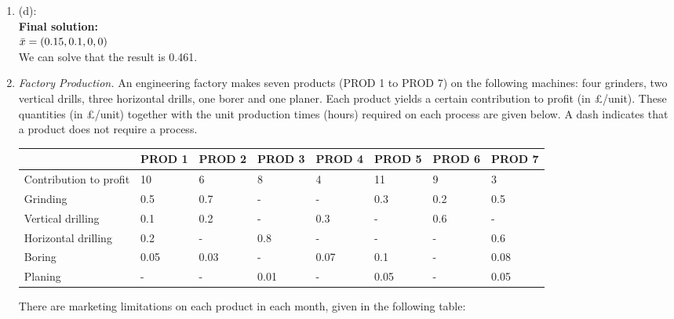 \documentclass[12pt,a4paper]{article}
\makeatletter
\newtheorem*{solution}{Solution}
\theoremstyle{definition}
\renewenvironment{solution}[1][Solution] {\par\pushQED{\qed}\normalfont\topsep6\p@\@plus6\p@\relax\trivlist\item[\hskip\labelsep\bfseries#1\@addpunct{.}]\ignorespaces}{\popQED\endtrivlist\@endpefalse} \makeatother
\makeatother
\begin{document}
\begin{enumerate}
\begin{solution}
    
    
    (d):\\
    \textbf{Final solution: }\\
    
    $\Bar{x} = \left(0.15, 0.1, 0, 0\right)$\\
    We can solve that the result is 0.461.
    
    
    
    \end{solution}
    
    
    
    
    \item
    \textit{Factory Production.} An engineering factory makes seven products (PROD 1 to PROD 7) on the following machines: four grinders, two vertical drills, three horizontal drills, one borer and one planer. Each product yields a certain contribution to profit (in \pounds/unit). These quantities (in \pounds/unit) together with the unit production times (hours) required on each process are given below. A dash indicates that a product does not require a process.

    \begin{table}[htbp]
      \scriptsize
      \centering
      \renewcommand\arraystretch{1.1}
      \begin{tabular}{m{} m{}<{\centering} m{}<{\centering} m{}<{\centering} m{}<{\centering} m{}<{\centering} m{}<{\centering} m{}<{\centering}}
      \hline
       & \textbf{PROD 1} & \textbf{PROD 2} & \textbf{PROD 3} & \textbf{PROD 4} & \textbf{PROD 5} & \textbf{PROD 6} &  \textbf{PROD 7} \\\hline
      Contribution to profit & 10 & 6 & 8 & 4 & 11 & 9 & 3 \\
      Grinding & 0.5 & 0.7 & - & - & 0.3 & 0.2 & 0.5 \\
      Vertical drilling & 0.1 & 0.2 & - & 0.3 & - & 0.6 & - \\
      Horizontal drilling & 0.2 & - & 0.8 & - & - & - & 0.6 \\
      Boring & 0.05 & 0.03 & - & 0.07 & 0.1 & - & 0.08 \\
      Planing & - & - & 0.01 & - & 0.05 & - & 0.05 \\
      \hline
      \end{tabular}
    \end{table}

    There are marketing limitations on each product in each month, given in the following table:


\end{enumerate}
\end{document}

